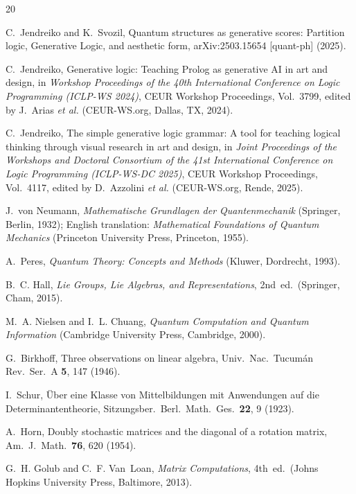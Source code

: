 \documentclass[
  twocolumn,
  aps,
  pra,
  showkeys,
  amsmath,amssymb,
  longbibliography
]{revtex4-2}
\begin{document}
\begin{thebibliography}{20}

C.~Jendreiko and K.~Svozil,
Quantum structures as generative scores:
Partition logic, Generative Logic, and aesthetic form,
arXiv:2503.15654 [quant-ph] (2025).

C.~Jendreiko,
Generative logic: Teaching Prolog as generative AI in art and
design,
in \emph{Workshop Proceedings of the 40th International
Conference on Logic Programming (ICLP-WS 2024)},
CEUR Workshop Proceedings, Vol.~3799,
edited by J.~Arias \emph{et al.}
(CEUR-WS.org, Dallas, TX, 2024).

C.~Jendreiko,
The simple generative logic grammar: A tool for teaching
logical thinking through visual research in art and design,
in \emph{Joint Proceedings of the Workshops and Doctoral
Consortium of the 41st International Conference on Logic
Programming (ICLP-WS-DC 2025)},
CEUR Workshop Proceedings, Vol.~4117,
edited by D.~Azzolini \emph{et al.}
(CEUR-WS.org, Rende, 2025).

J.~von Neumann,
\emph{Mathematische Grundlagen der Quantenmechanik}
(Springer, Berlin, 1932);
English translation: \emph{Mathematical Foundations of Quantum
Mechanics} (Princeton University Press, Princeton, 1955).

A.~Peres,
\emph{Quantum Theory: Concepts and Methods}
(Kluwer, Dordrecht, 1993).

B.~C. Hall,
\emph{Lie Groups, Lie Algebras, and Representations},
2nd~ed.\ (Springer, Cham, 2015).

M.~A. Nielsen and I.~L. Chuang,
\emph{Quantum Computation and Quantum Information}
(Cambridge University Press, Cambridge, 2000).

G.~Birkhoff,
Three observations on linear algebra,
Univ.\ Nac.\ Tucum\'an Rev.\ Ser.~A \textbf{5}, 147 (1946).

I.~Schur,
\"Uber eine Klasse von Mittelbildungen mit Anwendungen auf
die Determinantentheorie,
Sitzungsber.\ Berl.\ Math.\ Ges.\ \textbf{22}, 9 (1923).

A.~Horn,
Doubly stochastic matrices and the diagonal of a rotation
matrix,
Am.\ J.\ Math.\ \textbf{76}, 620 (1954).

G.~H. Golub and C.~F. Van~Loan,
\emph{Matrix Computations}, 4th~ed.\
(Johns Hopkins University Press, Baltimore, 2013).


\end{thebibliography}
\end{document}
